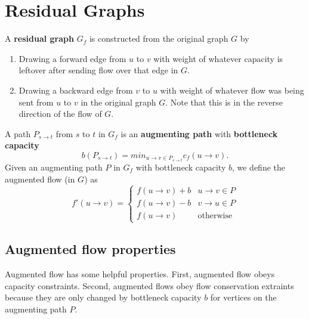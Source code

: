 \documentclass[titlepage, 12pt, leqno]{article}
\begin{document}
\section{Residual Graphs}
A \textbf{residual graph} $G_{f}$ is constructed from the original graph $G$ by
\begin{enumerate}
    \item Drawing a forward edge from $u$ to $v$ with weight of whatever 
        capacity is leftover after sending flow over that edge in $G$.
    \item Drawing a backward edge from $v$ to $u$ with weight of whatever flow
        was being sent from $u$ to $v$ in the original graph $G$. Note that this
        is in the reverse direction of the flow of $G$.
\end{enumerate}

A path $P_{s\rightarrow t}$ from $s$ to $t$ in $G_{f}$ is an \textbf{augmenting
path} with \textbf{bottleneck capacity}
\[
    b(P_{s\rightarrow t}) = min_{u\rightarrow v \in P_{s\rightarrow t}}
    c_{f}(u \rightarrow v).
\]
Given an augmenting path $P$ in $G_{f}$ with bottleneck capacity $b$, we define
the augmented flow (in $G$) as
\[
f'(u\rightarrow v) =
\begin{cases}
    f(u\rightarrow v) +b & u\rightarrow v \in P \\
    f(u\rightarrow v)-b & v\rightarrow u \in P\\
    f(u\rightarrow v) & \text{otherwise}
\end{cases}
\]
\subsection{Augmented flow properties}
Augmented flow has some helpful properties. First, augmented flow obeys capacity
constraints. Second, augmented flows obey flow conservation extraints because
they are only changed by bottleneck capacity $b$ for vertices on the augmenting
path $P$.
\end{document}

